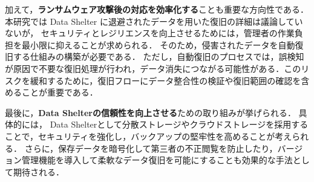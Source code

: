 加えて，\textbf{ランサムウェア攻撃後の対応を効率化する}ことも重要な方向性である．
本研究では Data Shelter に退避されたデータを用いた復旧の詳細は議論していないが，
セキュリティとレジリエンスを向上させるためには，管理者の作業負担を最小限に抑えることが求められる．
そのため，侵害されたデータを自動復旧する仕組みの構築が必要である．
ただし，自動復旧のプロセスでは，誤検知が原因で不要な復旧処理が行われ，データ消失につながる可能性がある．このリスクを緩和するために，復旧フローにデータ整合性の検証や復旧範囲の確認を含めることが重要である．

最後に，\textbf{Data Shelterの信頼性を向上させる}ための取り組みが挙げられる．
具体的には，
Data Shelterとして分散ストレージやクラウドストレージを採用することで，セキュリティを強化し，バックアップの堅牢性を高めることが考えられる．
さらに，保存データを暗号化して第三者の不正閲覧を防止したり，バージョン管理機能を導入して柔軟なデータ復旧を可能にすることも効果的な手法として期待される．
